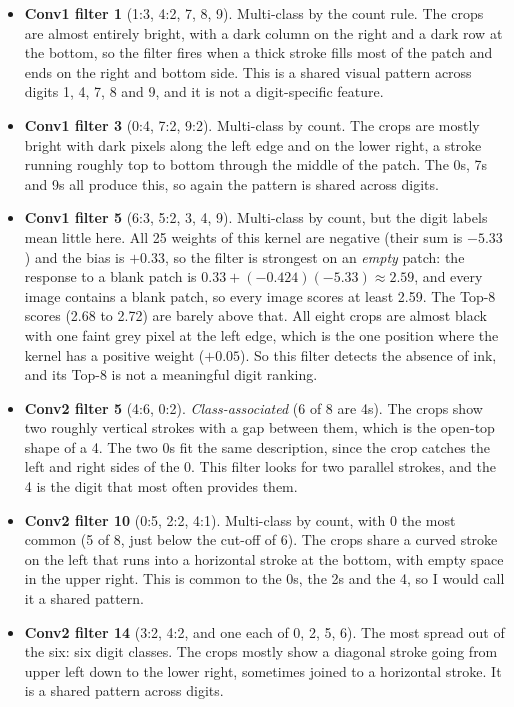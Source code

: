 \documentclass[12pt]{article}
\begin{document}
\begin{itemize}
\item \textbf{Conv1 filter 1} (1:3, 4:2, 7, 8, 9). Multi-class by the count rule. The crops are almost entirely bright, with a dark column on the right and a dark row at the bottom, so the filter fires when a thick stroke fills most of the patch and ends on the right and bottom side. This is a shared visual pattern across digits 1, 4, 7, 8 and 9, and it is not a digit-specific feature.
\item \textbf{Conv1 filter 3} (0:4, 7:2, 9:2). Multi-class by count. The crops are mostly bright with dark pixels along the left edge and on the lower right, a stroke running roughly top to bottom through the middle of the patch. The 0s, 7s and 9s all produce this, so again the pattern is shared across digits.
\item \textbf{Conv1 filter 5} (6:3, 5:2, 3, 4, 9). Multi-class by count, but the digit labels mean little here. All 25 weights of this kernel are negative (their sum is $-5.33$) and the bias is $+0.33$, so the filter is strongest on an \emph{empty} patch: the response to a blank patch is $0.33+(-0.424)(-5.33)\approx 2.59$, and every image contains a blank patch, so every image scores at least 2.59. The Top-8 scores (2.68 to 2.72) are barely above that. All eight crops are almost black with one faint grey pixel at the left edge, which is the one position where the kernel has a positive weight ($+0.05$). So this filter detects the absence of ink, and its Top-8 is not a meaningful digit ranking.
\item \textbf{Conv2 filter 5} (4:6, 0:2). \emph{Class-associated} (6 of 8 are 4s). The crops show two roughly vertical strokes with a gap between them, which is the open-top shape of a 4. The two 0s fit the same description, since the crop catches the left and right sides of the 0. This filter looks for two parallel strokes, and the 4 is the digit that most often provides them.
\item \textbf{Conv2 filter 10} (0:5, 2:2, 4:1). Multi-class by count, with 0 the most common (5 of 8, just below the cut-off of 6). The crops share a curved stroke on the left that runs into a horizontal stroke at the bottom, with empty space in the upper right. This is common to the 0s, the 2s and the 4, so I would call it a shared pattern.
\item \textbf{Conv2 filter 14} (3:2, 4:2, and one each of 0, 2, 5, 6). The most spread out of the six: six digit classes. The crops mostly show a diagonal stroke going from upper left down to the lower right, sometimes joined to a horizontal stroke. It is a shared pattern across digits.
\end{itemize}
\end{document}
